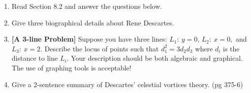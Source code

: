 \documentclass[12pt]{article}
\begin{document}
\begin{enumerate}
\item Read Section 8.2 and answer the questions below.
\item Give three biographical details about Rene Descartes.
\vfill
\item \textbf{[A 3-line Problem]} Suppose you have three lines: $L_1: \: y=0$, $L_2: \: x=0,$ and $L_3: \: x=2.$ Describe the locus of points such that $d_1^2=3d_2d_3$ where $d_i$ is the distance to line $L_i.$  Your description should be both algebraic and graphical. The use of graphing tools is acceptable! 
\vfill
\item Give a 2-sentence summary of Descartes' celestial vortices theory. (pg 375-6)
\vfill
\end{enumerate}
\end{document}
